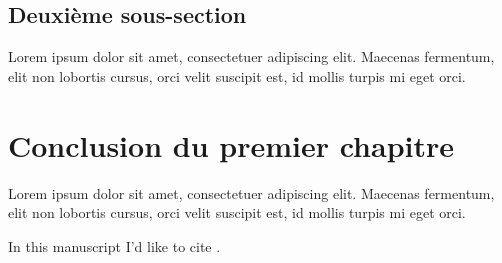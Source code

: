 \begin{bibunit}
\subsection{Deuxième sous-section}

Lorem ipsum dolor sit amet, consectetuer adipiscing elit. Maecenas fermentum, elit non lobortis cursus, orci velit suscipit est, id mollis turpis mi eget orci.

\section{Conclusion du premier chapitre}

Lorem ipsum dolor sit amet, consectetuer adipiscing elit. Maecenas fermentum, elit non lobortis cursus, orci velit suscipit est, id mollis turpis mi eget orci.

In this manuscript I'd like to cite \cite{remo3,remo4}.

\end{bibunit}
